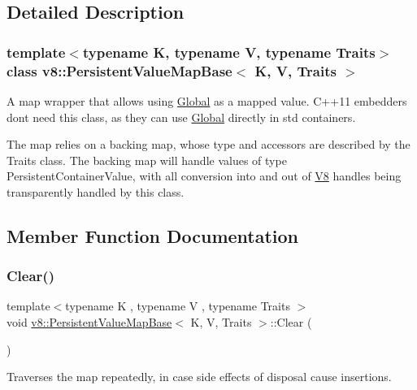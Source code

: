\subsection{Detailed Description}
\subsubsection*{template$<$typename K, typename V, typename Traits$>$\newline
class v8\+::\+Persistent\+Value\+Map\+Base$<$ K, V, Traits $>$}

A map wrapper that allows using \mbox{\hyperlink{classv8_1_1Global}{Global}} as a mapped value. C++11 embedders don\textquotesingle{}t need this class, as they can use \mbox{\hyperlink{classv8_1_1Global}{Global}} directly in std containers.

The map relies on a backing map, whose type and accessors are described by the Traits class. The backing map will handle values of type Persistent\+Container\+Value, with all conversion into and out of \mbox{\hyperlink{classv8_1_1V8}{V8}} handles being transparently handled by this class. 

\subsection{Member Function Documentation}
\mbox{\label{classv8_1_1PersistentValueMapBase_a1bf074e7a7c24713c9a3d40ddce89e74}} 
\subsubsection{\texorpdfstring{Clear()}{Clear()}}
{\footnotesize\ttfamily template$<$typename K , typename V , typename Traits $>$ \\
void \mbox{\hyperlink{classv8_1_1PersistentValueMapBase}{v8\+::\+Persistent\+Value\+Map\+Base}}$<$ K, V, Traits $>$\+::Clear (\begin{DoxyParamCaption}{ }\end{DoxyParamCaption})\hspace{0.3cm}{\ttfamily [inline]}}

Traverses the map repeatedly, in case side effects of disposal cause insertions. \mbox{\label{classv8_1_1PersistentValueMapBase_a8c68e5f99c4042541c6d32232c97282a}} 
